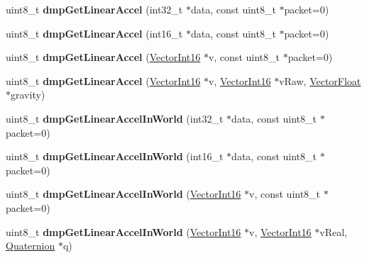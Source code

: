 \begin{DoxyCompactItemize}
uint8\+\_\+t {\bfseries dmp\+Get\+Linear\+Accel} (int32\+\_\+t $\ast$data, const uint8\+\_\+t $\ast$packet=0)
\item 
\mbox{\label{classMPU6050_ac3a746d1a5c2d9973f2315bd998fb102}} 
uint8\+\_\+t {\bfseries dmp\+Get\+Linear\+Accel} (int16\+\_\+t $\ast$data, const uint8\+\_\+t $\ast$packet=0)
\item 
\mbox{\label{classMPU6050_a72cfa08b409ce18689f19b81bd285780}} 
uint8\+\_\+t {\bfseries dmp\+Get\+Linear\+Accel} (\mbox{\hyperlink{classVectorInt16}{Vector\+Int16}} $\ast$v, const uint8\+\_\+t $\ast$packet=0)
\item 
\mbox{\label{classMPU6050_aa58cddb02075ed4e7ae0afa51cfdce7d}} 
uint8\+\_\+t {\bfseries dmp\+Get\+Linear\+Accel} (\mbox{\hyperlink{classVectorInt16}{Vector\+Int16}} $\ast$v, \mbox{\hyperlink{classVectorInt16}{Vector\+Int16}} $\ast$v\+Raw, \mbox{\hyperlink{classVectorFloat}{Vector\+Float}} $\ast$gravity)
\item 
\mbox{\label{classMPU6050_a1c63096808722eafb96e88e41a4af115}} 
uint8\+\_\+t {\bfseries dmp\+Get\+Linear\+Accel\+In\+World} (int32\+\_\+t $\ast$data, const uint8\+\_\+t $\ast$packet=0)
\item 
\mbox{\label{classMPU6050_a097673d9ae96274ab711aaef7827411d}} 
uint8\+\_\+t {\bfseries dmp\+Get\+Linear\+Accel\+In\+World} (int16\+\_\+t $\ast$data, const uint8\+\_\+t $\ast$packet=0)
\item 
\mbox{\label{classMPU6050_a848b210e89382c1f7c7fb3ee679b3852}} 
uint8\+\_\+t {\bfseries dmp\+Get\+Linear\+Accel\+In\+World} (\mbox{\hyperlink{classVectorInt16}{Vector\+Int16}} $\ast$v, const uint8\+\_\+t $\ast$packet=0)
\item 
\mbox{\label{classMPU6050_a6c09e9168261daff945d1e0757598b61}} 
uint8\+\_\+t {\bfseries dmp\+Get\+Linear\+Accel\+In\+World} (\mbox{\hyperlink{classVectorInt16}{Vector\+Int16}} $\ast$v, \mbox{\hyperlink{classVectorInt16}{Vector\+Int16}} $\ast$v\+Real, \mbox{\hyperlink{classQuaternion}{Quaternion}} $\ast$q)
\item 
\mbox{\label{classMPU6050_acf5f700d018798475b93d56652e39788}} 

\end{DoxyCompactItemize}
